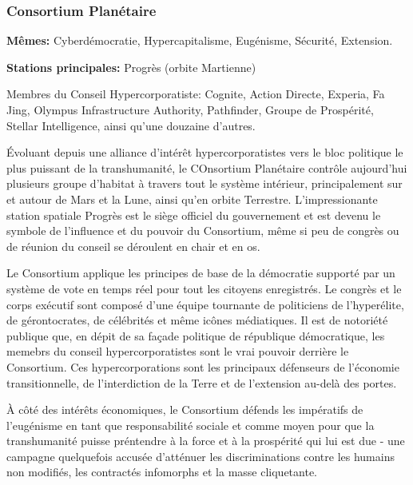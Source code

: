                               \subsubsection{Consortium Planétaire} \label{sec:planetary-consortium} 

                              \textbf{Mêmes:} Cyberdémocratie, Hypercapitalisme, Eugénisme, Sécurité, Extension. 

                              \textbf{Stations principales:} Progrès (orbite Martienne) 

                              Membres du Conseil Hypercorporatiste: Cognite, Action Directe, Experia, Fa Jing, Olympus Infrastructure Authority, Pathfinder, Groupe de Prospérité, Stellar Intelligence, ainsi qu'une douzaine d'autres. 

                              Évoluant depuis une alliance d'intérêt hypercorporatistes vers le bloc politique le plus puissant de la transhumanité, le COnsortium Planétaire contrôle aujourd'hui plusieurs groupe d'habitat à travers tout le système intérieur, principalement sur et autour de Mars et la Lune, ainsi qu'en orbite Terrestre. L'impressionante station spatiale Progrès est le siège officiel du gouvernement et est devenu le symbole de l'influence et du pouvoir du Consortium, même si peu de congrès ou de réunion du conseil se déroulent en chair et en os. 

                              Le Consortium applique les principes de base de la démocratie supporté par un système de vote en temps réel pour tout les citoyens enregistrés. Le congrès et le corps exécutif sont composé d'une équipe tournante de politiciens de l'hyperélite, de gérontocrates, de célébrités et même icônes médiatiques. Il est de notoriété publique que, en dépit de sa façade politique de république démocratique, les memebrs du conseil hypercorporatistes sont le vrai pouvoir derrière le Consortium. Ces hypercorporations sont les principaux défenseurs de l'économie transitionnelle, de l'interdiction de la Terre et de l'extension au-delà des portes. 

                              À côté des intérêts économiques, le Consortium défends les impératifs de l'eugénisme en tant que responsabilité sociale et comme moyen pour que la transhumanité puisse préntendre à la force et à la prospérité qui lui est due - une campagne quelquefois accusée d'atténuer les discriminations contre les humains non modifiés, les contractés infomorphs et la masse cliquetante. 


